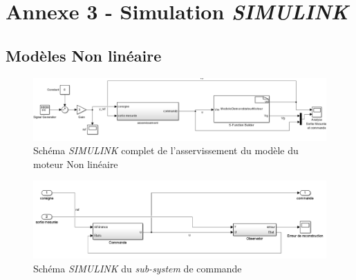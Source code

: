 \chapter*{Annexe 3 - Simulation \emph{SIMULINK}}

\section*{Modèles Non linéaire}\label{annex:modl_NL_SIMULINK}
\begin{figure}
\centering
\includegraphics[width = \textwidth]{./annexes/annexe3/NL_RE_BlocEntier.png}
\caption{Schéma \emph{SIMULINK} complet de l'asservissement du modèle du moteur Non linéaire\label{fig:SIMULINK_NL_schema}}
\end{figure}

\begin{figure}
\centering
\includegraphics[width = \textwidth]{./annexes/annexe3/NL_RE_blocAsservissement.PNG}
\caption{Schéma \emph{SIMULINK} du \emph{sub-system} de commande\label{fig:SIMULINK_NL_subsystem_schema}}
\end{figure}

